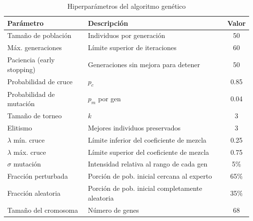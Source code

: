 \documentclass[11pt]{article}
\begin{document}
\begin{table}[H]
    \centering
    \caption{Hiperpar\'ametros del algoritmo gen\'etico}
    \begin{tabular}{p{4cm}p{8cm}c}
        \toprule
        \textbf{Par\'ametro}       & \textbf{Descripci\'on}                            & \textbf{Valor} \\
        \midrule
        Tama\~no de poblaci\'on    & Individuos por generaci\'on                       & 50             \\
        M\'ax. generaciones        & L\'imite superior de iteraciones                  & 60             \\
        Paciencia (early stopping) & Generaciones sin mejora para detener              & 50             \\
        Probabilidad de cruce      & $p_c$                                             & 0.85           \\
        Probabilidad de mutaci\'on & $p_m$ por gen                                     & 0.04           \\
        Tama\~no de torneo         & $k$                                               & 3              \\
        Elitismo                   & Mejores individuos preservados                    & 3              \\
        $\lambda$ m\'in. cruce     & L\'imite inferior del coeficiente de mezcla       & 0.25           \\
        $\lambda$ m\'ax. cruce     & L\'imite superior del coeficiente de mezcla       & 0.75           \\
        $\sigma$ mutaci\'on        & Intensidad relativa al rango de cada gen          & 5\%            \\
        Fracci\'on perturbada      & Porci\'on de pob. inicial cercana al experto      & 65\%           \\
        Fracci\'on aleatoria       & Porci\'on de pob. inicial completamente aleatoria & 35\%           \\
        Tama\~no del cromosoma     & N\'umero de genes                                 & 68             \\
        \bottomrule
    \end{tabular}
    \label{tab:parametros_ag}
    \par{}
\end{table}
\end{document}
